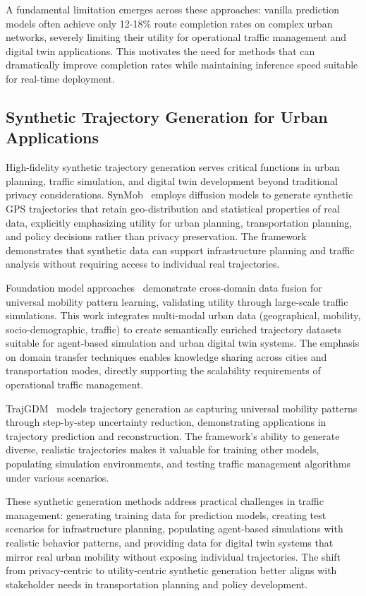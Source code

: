 A fundamental limitation emerges across these approaches: vanilla prediction models often achieve only 12-18\% route completion rates on complex urban networks, severely limiting their utility for operational traffic management and digital twin applications. This motivates the need for methods that can dramatically improve completion rates while maintaining inference speed suitable for real-time deployment.

\subsection{Synthetic Trajectory Generation for Urban Applications}
\label{sec:lit-synthetic-urban}

High-fidelity synthetic trajectory generation serves critical functions in urban planning, traffic simulation, and digital twin development beyond traditional privacy considerations. SynMob~\cite{zhuSynMobCreatingHighFidelity} employs diffusion models to generate synthetic GPS trajectories that retain geo-distribution and statistical properties of real data, explicitly emphasizing utility for urban planning, transportation planning, and policy decisions rather than privacy preservation. The framework demonstrates that synthetic data can support infrastructure planning and traffic analysis without requiring access to individual real trajectories.

Foundation model approaches~\cite{maLearningUniversalHuman2025} demonstrate cross-domain data fusion for universal mobility pattern learning, validating utility through large-scale traffic simulations. This work integrates multi-modal urban data (geographical, mobility, socio-demographic, traffic) to create semantically enriched trajectory datasets suitable for agent-based simulation and urban digital twin systems. The emphasis on domain transfer techniques enables knowledge sharing across cities and transportation modes, directly supporting the scalability requirements of operational traffic management.

TrajGDM~\cite{chuSimulatingHumanMobility2024} models trajectory generation as capturing universal mobility patterns through step-by-step uncertainty reduction, demonstrating applications in trajectory prediction and reconstruction. The framework's ability to generate diverse, realistic trajectories makes it valuable for training other models, populating simulation environments, and testing traffic management algorithms under various scenarios.

These synthetic generation methods address practical challenges in traffic management: generating training data for prediction models, creating test scenarios for infrastructure planning, populating agent-based simulations with realistic behavior patterns, and providing data for digital twin systems that mirror real urban mobility without exposing individual trajectories. The shift from privacy-centric to utility-centric synthetic generation better aligns with stakeholder needs in transportation planning and policy development.


